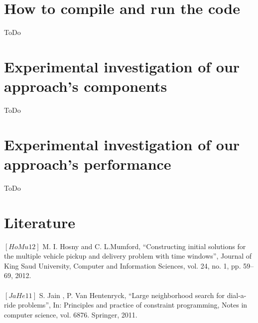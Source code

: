 \documentclass[fleqn]{scrartcl}
\begin{document}
\section{How to compile and run the code}
ToDo
\newpage

\section{Experimental investigation of our approach's components}
ToDo
\newpage

\section{Experimental investigation of our approach's performance}
ToDo
\newpage


\section{Literature}
$[HoMu 12]$ M. I. Hosny and C. L.Mumford, “Constructing initial solutions for the multiple vehicle pickup and delivery problem with time windows”, Journal of King Saud University, Computer and Information Sciences, vol. 24, no. 1, pp. 59–69, 2012.
\\
\\
$[JaHe 11]$ S. Jain , P. Van Hentenryck, “Large neighborhood search for dial-a-ride problems”, In: Principles and practice of constraint programming, Notes in computer science, vol. 6876. Springer, 2011.
\end{document}
